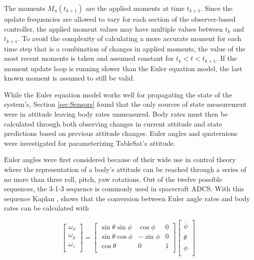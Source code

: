 The moments $M_n(t_{k+1})$ are the applied moments at time $t_{k+1}$.  Since the update frequencies are allowed to vary for each section of the observer-based controller, the applied moment values may have multiple values between $t_{k}$ and $t_{k+1}$.  To avoid the complexity of calculating a more accurate moment for each time step that is a combination of changes in applied moments, the value of the most recent moments is taken and assumed constant for $t_{k} < t < t_{k+1}$.  If the moment update loop is running slower than the Euler equation model, the last known moment is assumed to still be valid.

While the Euler equation model works well for propagating the state of the system's, Section \ref{sec:Sensors} found that the only sources of state measurement were in attitude leaving body rates unmeasured.  Body rates must then be calculated through both observing changes in current attitude and state predictions based on previous attitude changes.  Euler angles and quaternions were investigated for parameterizing TableSat's attitude.

Euler angles were first considered because of their wide use in control theory where the representation of a body's attitude can be reached through a series of no more than three roll, pitch, yaw rotations.   Out of the twelve possible sequences, the 3-1-3 sequence is commonly used in spacecraft ADCS.  With this sequence Kaplan \cite{kaplan}, shows that the conversion between Euler angle rates and body rates can be calculated with

\begin{equation}
  \begin{bmatrix}
    \omega_x \\
    \omega_y \\
    \omega_z \\
  \end{bmatrix}
  =
  \begin{bmatrix}
    \sin \theta \sin \phi & \cos \phi & 0 \\
    \sin \theta \cos \phi & - \sin \phi & 0 \\
    \cos \theta & 0 & 1 \\
  \end{bmatrix}
  \begin{bmatrix}
    \dot{\psi} \\
    \dot{\theta} \\
    \dot{\phi} \\
  \end{bmatrix}
  \label{eqn:EulerToBodyRate}
\end{equation}

